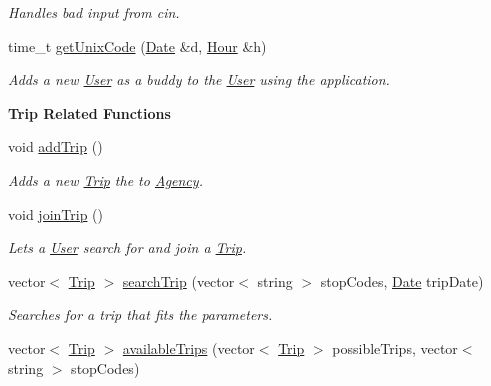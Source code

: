 \begin{Indent}
\begin{DoxyCompactItemize}
\begin{DoxyCompactList}\small\item\em Handles bad input from cin. \end{DoxyCompactList}\item 
time\+\_\+t \hyperlink{class_agency_a00fdbd79de096b13dd0033478552164a}{get\+Unix\+Code} (\hyperlink{class_date}{Date} \&d, \hyperlink{class_hour}{Hour} \&h)
\begin{DoxyCompactList}\small\item\em Adds a new \hyperlink{class_user}{User} as a buddy to the \hyperlink{class_user}{User} using the application. \end{DoxyCompactList}\end{DoxyCompactItemize}
\end{Indent}
\begin{Indent}\textbf{ Trip Related Functions}\par
\begin{DoxyCompactItemize}
\item 
void \hyperlink{class_agency_aa0c7d82673ce6b573ccc46da3289634c}{add\+Trip} ()
\begin{DoxyCompactList}\small\item\em Adds a new \hyperlink{class_trip}{Trip} the to \hyperlink{class_agency}{Agency}. \end{DoxyCompactList}\item 
\mbox{\label{class_agency_ae2599882efc55adb7f295aeec65520d6}} 
void \hyperlink{class_agency_ae2599882efc55adb7f295aeec65520d6}{join\+Trip} ()
\begin{DoxyCompactList}\small\item\em Lets a \hyperlink{class_user}{User} search for and join a \hyperlink{class_trip}{Trip}. \end{DoxyCompactList}\item 
vector$<$ \hyperlink{class_trip}{Trip} $>$ \hyperlink{class_agency_a7ec6b058801f49850148979c1a41554a}{search\+Trip} (vector$<$ string $>$ stop\+Codes, \hyperlink{class_date}{Date} trip\+Date)
\begin{DoxyCompactList}\small\item\em Searches for a trip that fits the parameters. \end{DoxyCompactList}\item 
vector$<$ \hyperlink{class_trip}{Trip} $>$ \hyperlink{class_agency_a892474fd8930e8e78e743e2b185b35ac}{available\+Trips} (vector$<$ \hyperlink{class_trip}{Trip} $>$ possible\+Trips, vector$<$ string $>$ stop\+Codes)

\end{DoxyCompactItemize}
\end{Indent}
